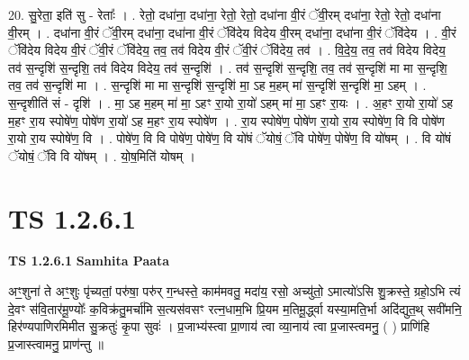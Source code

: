 \documentclass[17pt]{extarticle}
\begin{document}
20. सु॒रेता॒ इति॑ सु - रेताः᳚ । . रेतो॒ दधा॑ना॒ दधा॑ना॒ रेतो॒ रेतो॒ दधा॑ना वी॒रं ॅवी॒रम् दधा॑ना॒ रेतो॒ रेतो॒ दधा॑ना वी॒रम् । . दधा॑ना वी॒रं ॅवी॒रम् दधा॑ना॒ दधा॑ना वी॒रं ॅवि॑देय विदेय वी॒रम् दधा॑ना॒ दधा॑ना वी॒रं ॅवि॑देय । . वी॒रं ॅवि॑देय विदेय वी॒रं ॅवी॒रं ॅवि॑देय॒ तव॒ तव॑ विदेय वी॒रं ॅवी॒रं ॅवि॑देय॒ तव॑ । . वि॒दे॒य॒ तव॒ तव॑ विदेय विदेय॒ तव॑ स॒न्दृशि॑ स॒न्दृशि॒ तव॑ विदेय विदेय॒ तव॑ स॒न्दृशि॑ । . तव॑ स॒न्दृशि॑ स॒न्दृशि॒ तव॒ तव॑ स॒न्दृशि॑ मा मा स॒न्दृशि॒ तव॒ तव॑ स॒न्दृशि॑ मा । . स॒न्दृशि॑ मा मा स॒न्दृशि॑ स॒न्दृशि॑ मा॒ ऽह म॒हम् मा॑ स॒न्दृशि॑ स॒न्दृशि॑ मा॒ ऽहम् । . स॒न्दृशीति॑ सं - दृशि॑ । . मा॒ ऽह म॒हम् मा॑ मा॒ ऽहꣳ रा॒यो रा॒यो॑ ऽहम् मा॑ मा॒ ऽहꣳ रा॒यः । . अ॒हꣳ रा॒यो रा॒यो॑ ऽह म॒हꣳ रा॒य स्पोषे॑ण॒ पोषे॑ण रा॒यो॑ ऽह म॒हꣳ रा॒य स्पोषे॑ण । . रा॒य स्पोषे॑ण॒ पोषे॑ण रा॒यो रा॒य स्पोषे॑ण॒ वि वि पोषे॑ण रा॒यो रा॒य स्पोषे॑ण॒ वि । . पोषे॑ण॒ वि वि पोषे॑ण॒ पोषे॑ण॒ वि यो॑षं ॅयोषं॒ ॅवि पोषे॑ण॒ पोषे॑ण॒ वि यो॑षम् । . वि यो॑षं ॅयोषं॒ ॅवि वि यो॑षम् । . यो॒ष॒मिति॑ योषम् । \newline
\pagebreak
{}

\section{ TS 1.2.6.1 }

\textbf{TS 1.2.6.1 } \newline
\textbf{Samhita Paata} \newline

अꣳ॒॒शुना॑ ते अꣳ॒॒शुः पृ॑च्यतां॒ परु॑षा॒ परु॑र् ग॒न्धस्ते॒ काम॑मवतु॒ मदा॑य॒ रसो॒ अच्यु॑तो॒ ऽमात्यो॑ऽसि शु॒क्रस्ते॒ ग्रहो॒ऽभि त्यं दे॒वꣳ स॑वि॒तार॑मू॒ण्योः᳚ क॒विक्र॑तु॒मर्चा॑मि स॒त्यस॑वसꣳ रत्न॒धाम॒भि प्रि॒यम म॒तिमू॒र्द्ध्वा यस्या॒मति॒र्भा अदि॑द्युत॒थ् सवी॑मनि॒ हिर॑ण्यपाणिरमिमीत सु॒क्रतुः॑ कृ॒पा सुवः॑ । प्र॒जाभ्य॑स्त्वा प्रा॒णाय॑ त्वा व्या॒नाय॑ त्वा प्र॒जास्त्वमनु॒ ( ) प्राणि॑हि प्र॒जास्त्वामनु॒ प्राण॑न्तु ॥ \newline
\end{document}
